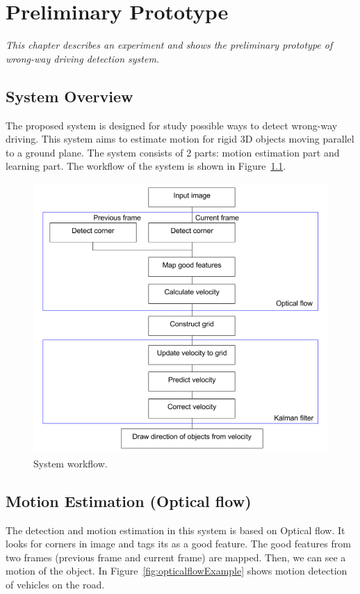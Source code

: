 \setlength{\footskip}{8mm}

\chapter{Preliminary Prototype}
\label{ch:methodology}

\textit{This chapter describes an experiment and shows the preliminary prototype of wrong-way driving detection system.}

\section{System Overview}

The proposed system is designed for study possible ways to detect wrong-way driving. This system aims to estimate motion for rigid 3D objects moving parallel to a ground plane. The system consists of 2 parts: motion estimation part and learning part. The workflow of the system is shown in Figure~\ref{fig:System workflow}.  

\begin{figure}[t]
	\centering
	\includegraphics[width=6in]{figures/workflow.jpg}  
	\caption[System workflow]{ System workflow.}
	\label{fig:System workflow}
\end{figure}

\section{Motion Estimation (Optical flow)}
The detection and motion estimation in this system is based on Optical flow. It looks for corners in image and tags its as a good feature. The good features from two frames (previous frame and current frame) are mapped. Then, we can see a motion of the object. In Figure~\ref{fig:opticalflowExample} shows motion detection of vehicles on the road. 

